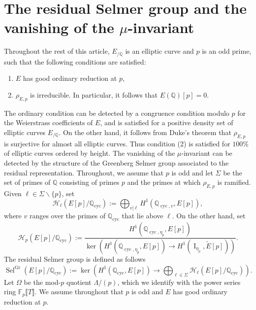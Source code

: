 \documentclass[12pt]{amsart}
\newcommand{\cH}{\mathcal{H}}
\newcommand{\Q}{\mathbb{Q}}
\newcommand{\F}{\mathbb{F}}
\newcommand{\op}[1]{\operatorname{#1}}
\numberwithin{equation}{section}
\begin{document}
\section{The residual Selmer group and the vanishing of the $\mu$-invariant}
\label{s 3}
\par Throughout the rest of this article, $E_{/\Q}$ is an elliptic curve and $p$ is an odd prime, such that the following conditions are satisfied: 
\begin{enumerate}
    \item $E$ has good ordinary reduction at $p$, 
    \item $\rho_{E,p}$ is irreducible. In particular, it follows that $E(\Q)[p]=0$.
\end{enumerate}
The ordinary condition can be detected by a congruence condition modulo $p$ for the Weierstrass coefficients of $E$, and is satisfied for a positive density set of elliptic curves $E_{/\Q}$. On the other hand, it follows from Duke's theorem that $\rho_{E,p}$ is surjective for almost all elliptic curves. Thus condition (2) is satisfied for $100\%$ of elliptic curves ordered by height. The vanishing of the $\mu$-invariant can be detected by the structure of the Greenberg Selmer group associated to the residual representation. Throughout, we assume that $p$ is odd and let $\Sigma$ be the set of primes of $\Q$ consisting of primes $p$ and the primes at which $\rho_{E,p}$ is ramified. Given $\ell\in \Sigma\backslash \{p\}$, set \[\cH_\ell(E[p]/\Q_{\op{cyc}}):=\bigoplus_{v|\ell} H^1(\Q_{\op{cyc}, v}, E[p]),\] where $v$ ranges over the primes of $\Q_{\op{cyc}}$ that lie above $\ell$. On the other hand, set \[\cH_p(E[p]/\Q_{\op{cyc}}):=\frac{H^1(\Q_{\op{cyc}, \eta_p}, E[p])}{\op{ker}\left(H^1(\Q_{\op{cyc}, \eta_p}, E[p])\longrightarrow H^1(\op{I}_{\eta_p}, \widetilde{E}[p])\right)}.\]
The residual Selmer group is defined as follows
\begin{equation}\label{residual greenberg selmer group}\op{Sel}^{\op{Gr}}(E[p]/\Q_{\op{cyc}}):=\op{ker}\left(H^1(\Q_{\op{cyc}}, E[p])\longrightarrow \bigoplus_{\ell\in \Sigma} \cH_\ell(E[p]/\Q_{\op{cyc}})\right).\end{equation}
Let $\Omega$ be the mod-$p$ quotient $\Lambda/(p)$, which we identify with the power series ring $\F_p\llbracket T \rrbracket$. We assume throughout that $p$ is odd and $E$ has good ordinary reduction at $p$.
\end{document}
